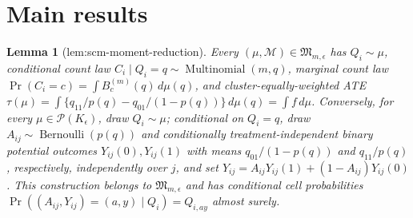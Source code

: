 \documentclass{article}
\newtheorem{lemma}{Lemma}
\begin{document}
\section{Main results}

\begin{lemma}[lem:scm-moment-reduction]\label{lem:scm-moment-reduction}
Every \((\mu,\mathcal M)\in\mathfrak M_{m,\epsilon}\) has \(Q_i\sim\mu\), conditional count law \(C_i\mid Q_i=q\sim\operatorname{Multinomial}(m,q)\), marginal count law \(\Pr(C_i=c)=\int B_c^{(m)}(q)\,d\mu(q)\), and cluster-equally-weighted ATE \(\tau(\mu)=\int\{q_{11}/p(q)-q_{01}/(1-p(q))\}\,d\mu(q)=\int f\,d\mu\). Conversely, for every \(\mu\in\mathcal P(K_{\epsilon})\), draw \(Q_i\sim\mu\); conditional on \(Q_i=q\), draw \(A_{ij}\sim\operatorname{Bernoulli}(p(q))\) and conditionally treatment-independent binary potential outcomes \(Y_{ij}(0),Y_{ij}(1)\) with means \(q_{01}/(1-p(q))\) and \(q_{11}/p(q)\), respectively, independently over \(j\), and set \(Y_{ij}=A_{ij}Y_{ij}(1)+(1-A_{ij})Y_{ij}(0)\). This construction belongs to \(\mathfrak M_{m,\epsilon}\) and has conditional cell probabilities \(\Pr((A_{ij},Y_{ij})=(a,y)\mid Q_i)=Q_{i,ay}\) almost surely.
\end{lemma}
\end{document}
